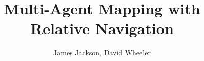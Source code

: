 \documentclass{article}
\title{Multi-Agent Mapping with Relative Navigation}
\author{James Jackson, David Wheeler}
\begin{document}
\maketitle


\begin{abstract}
  
\end{abstract}

\begin{spacing}{1.5}








\end{spacing}

%
%



\end{document}
